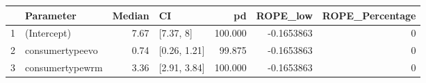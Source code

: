 \begin{table}[ht]
\centering
\begin{tabular}{llrlrrr}
  \hline
 & Parameter & Median & CI & pd & ROPE\_low & ROPE\_Percentage \\ 
  \hline
1 & (Intercept) & 7.67 & [7.37, 8] & 100.000 & -0.1653863 & 0 \\ 
  2 & consumertypeevo & 0.74 & [0.26, 1.21] & 99.875 & -0.1653863 & 0 \\ 
  3 & consumertypewrm & 3.36 & [2.91, 3.84] & 100.000 & -0.1653863 & 0 \\ 
   \hline
\end{tabular}
\end{table}

